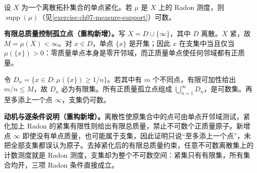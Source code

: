 \documentclass[../../main.tex]{subfiles}
\begin{document}
\begin{exercise}\label{exercise:ch07-discrete-compactification-support}
设 $X$ 为一个离散拓扑集合的单点紧化。若 $\mu$ 是 $X$ 上的 Radon 测度，则 $\operatorname{supp}(\mu)$（见\cref{exercise:ch07-measure-support}）可数。
\end{exercise}
\begin{solution}
\textbf{有限总质量控制孤立点（重构新增）。}写 $X=D\cup\{\infty\}$，其中 $D$ 离散。$X$ 紧，故 $M=\mu(X)<\infty$。对 $x\in D$，单点 $\{x\}$ 是开集；因此 $x$ 在支集中当且仅当 $\mu(\{x\})>0$：零质量单点本身是零开邻域，而正质量单点使任何邻域都有正质量。

令 $D_n=\{x\in D:\mu(\{x\})\geqslant1/n\}$。若其中有 $m$ 个不同点，有限可加性给出 $m/n\leqslant M$，故 $D_n$ 必为有限集。所有正质量孤立点组成 $\bigcup_{n=1}^\infty D_n$，是可数集。再至多添上一个点 $\infty$，支集仍可数。
\end{solution}
\begin{remark}
\textbf{动机与逐条件说明（重构新增）。}离散性使原集合中的点可由单点开邻域测试，紧化加上 Radon 的紧集有限性则给出有限总质量，禁止不可数个正质量原子。新增点 $\infty$ 即使没有单点质量，也可能属于支集，因此证明只说“至多添上一个点”，未把全部支集都误认为原子。去掉紧化后的有限总质量约束，任意不可数离散集上的计数测度就是 Radon 测度，支集却为整个不可数空间：紧集只有有限集，所有集合均开，三项 Radon 条件直接成立。
\end{remark}
\end{document}
